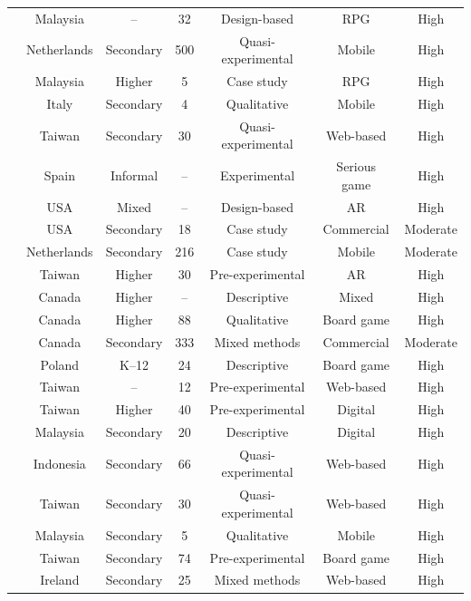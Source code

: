 \documentclass[a4paper,fleqn]{cas-sc}
\begin{document}
\begin{longtable}{|p{4.6cm}|c|c|c|c|c|c|}
\citet{48Moketar2021} & Malaysia & -- & 32 & Design-based & RPG & High \\
\citet{49Huizenga2007127} & Netherlands & Secondary & 500 & Quasi-experimental & Mobile & High \\
\citet{50Lye2013} & Malaysia & Higher & 5 & Case study & RPG & High \\
\citet{51Ardito2007} & Italy & Secondary & 4 & Qualitative & Mobile & High \\
\citet{52Lin2011265} & Taiwan & Secondary & 30 & Quasi-experimental & Web-based & High \\
\citet{53Perez2014} & Spain & Informal & -- & Experimental & Serious game & High \\
\citet{54Gibson2007} & USA & Mixed & -- & Design-based & AR & High \\
\citet{55Squire2004} & USA & Secondary & 18 & Case study & Commercial & Moderate \\
\citet{56Akkerman2009449} & Netherlands & Secondary & 216 & Case study & Mobile & Moderate \\
\citet{58Shih2015173} & Taiwan & Higher & 30 & Pre-experimental & AR & High \\
\citet{59Kee2014270} & Canada & Higher & -- & Descriptive & Mixed & High \\
\citet{60Hoy2018} & Canada & Higher & 88 & Qualitative & Board game & High \\
\citet{61Karsenti202027} & Canada & Secondary & 333 & Mixed methods & Commercial & Moderate \\
\citet{62Milosz201896} & Poland & K--12 & 24 & Descriptive & Board game & High \\
\citet{63Liu2021} & Taiwan & -- & 12 & Pre-experimental & Web-based & High \\
\citet{64Hsu201324} & Taiwan & Higher & 40 & Pre-experimental & Digital & High \\
\citet{65Razak201139} & Malaysia & Secondary & 20 & Descriptive & Digital & High \\
\citet{66Rahmawati2023163} &  Indonesia & Secondary & 66 & Quasi-experimental & Web-based & High \\
\citet{67Lin201296} & Taiwan & Secondary & 30 & Quasi-experimental & Web-based & High \\
\citet{69Wong2017150} & Malaysia & Secondary & 5 & Qualitative & Mobile & High \\
\citet{70Hou201519} & Taiwan & Secondary & 74 & Pre-experimental & Board game & High \\
\citet{71lynch2015pedagogical} &  Ireland & Secondary & 25 & Mixed methods & Web-based & High \\

\end{longtable}
\end{document}
